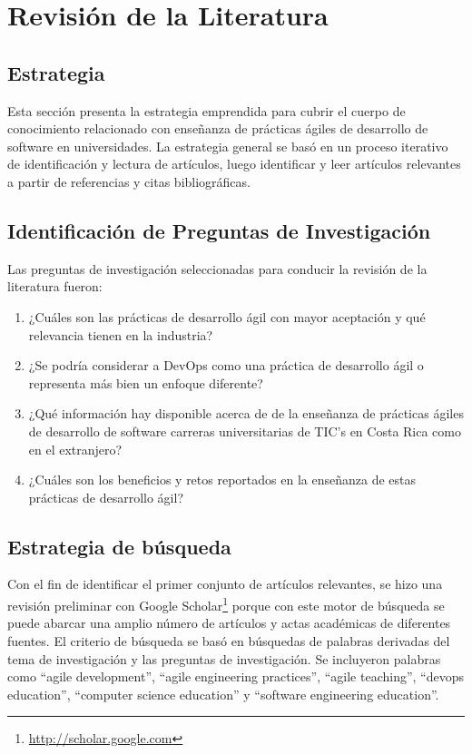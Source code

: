 \section{Revisión de la Literatura}

\subsection{Estrategia} \label{sec:estrategia}
Esta sección presenta la estrategia emprendida para cubrir el cuerpo de conocimiento relacionado con enseñanza de prácticas ágiles de desarrollo de software en universidades. La estrategia general se basó en un proceso iterativo de identificación y lectura de artículos, luego identificar y leer artículos relevantes a partir de referencias y citas bibliográficas.

\subsection{Identificación de Preguntas de Investigación}
Las preguntas de investigación seleccionadas para conducir la revisión de la literatura fueron:
\begin{enumerate}
    \item ¿Cuáles son las prácticas de desarrollo ágil con mayor aceptación y qué relevancia tienen en la industria?
    \item ¿Se podría considerar a DevOps como una práctica de desarrollo ágil o representa más bien un enfoque diferente?
    \item ¿Qué información hay disponible acerca de de la enseñanza de prácticas ágiles de desarrollo de software carreras universitarias de TIC's en Costa Rica como en el extranjero? 
    \item ¿Cuáles son los beneficios y retos reportados en la enseñanza de estas prácticas de desarrollo ágil?
\end{enumerate}

\subsection{Estrategia de búsqueda} \label{sec:estrategia-busqueda}
Con el fin de identificar el primer conjunto de artículos relevantes, se hizo una revisión preliminar con Google Scholar\footnote{\url{http://scholar.google.com}} porque con este motor de búsqueda se puede abarcar una amplio número de artículos y actas académicas de diferentes fuentes. El criterio de búsqueda se basó en búsquedas de palabras derivadas del tema de investigación y las preguntas de investigación. Se incluyeron palabras como ``agile development'', ``agile engineering practices'', ``agile teaching'', ``devops education'', ``computer science education'' y ``software engineering education''. 

